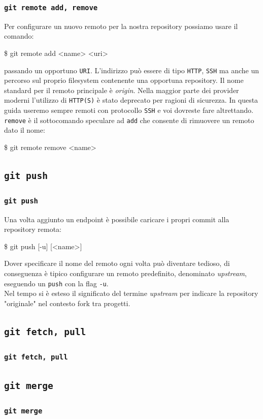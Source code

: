 \documentclass{beamer}
\begin{document}
\begin{frame}
  \frametitle{\texttt{git remote add, remove}}
  Per configurare un nuovo remoto per la nostra repository possiamo usare il
  comando:
  \begin{semiverbatim}
  \$ git remote add <name> <uri>
  \end{semiverbatim}
  passando un opportuno \texttt{URI}. L'indirizzo pu\`o essere di tipo
  \texttt{HTTP}, \texttt{SSH} ma anche un percorso sul proprio filesystem
  contenente una opportuna repository. Il nome standard per il remoto principale
  \`e \emph{origin}. Nella maggior parte dei provider moderni l'utilizzo di
  \texttt{HTTP(S)} \`e stato deprecato per ragioni di sicurezza. In questa guida
  useremo sempre remoti con protocollo \texttt{SSH} e voi dovreste fare
  altrettando. \\
  \texttt{remove} \`e il sottocomando speculare ad \texttt{add} che consente di
  rimuovere un remoto dato il nome:
  \begin{semiverbatim}
  \$ git remote remove <name>
  \end{semiverbatim}
\end{frame}

\subsection{\texttt{git push}}
\begin{frame}
  \frametitle{\texttt{git push}}
  Una volta aggiunto un endpoint \`e possibile caricare i propri commit alla
  repository remota:
  \begin{semiverbatim}
  \$ git push [-u] [<name>]
  \end{semiverbatim}
  Dover specificare il nome del remoto ogni volta pu\`o diventare tedioso, di
  conseguenza \`e tipico configurare un remoto predefinito, denominato
  \emph{upstream}, eseguendo un \texttt{push} con la flag \texttt{-u}. \\
  Nel tempo si \`e esteso il significato del termine \emph{upstream} per
  indicare la repository "originale" nel contesto fork tra progetti.
\end{frame}

\subsection{\texttt{git fetch, pull}}
\begin{frame}
  \frametitle{\texttt{git fetch, pull}}
\end{frame}

\subsection{\texttt{git merge}}
\begin{frame}
  \frametitle{\texttt{git merge}}
\end{frame}
\end{document}
